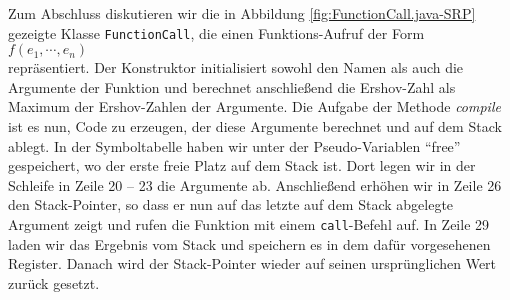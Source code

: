 Zum Abschluss diskutieren wir die in Abbildung \ref{fig:FunctionCall.java-SRP} gezeigte 
 Klasse \texttt{FunctionCall}, die einen Funktions-Aufruf der Form
\\[0.2cm]
\hspace*{1.3cm}
$f(e_1, \cdots, e_n)$
\\[0.2cm]
repr\"asentiert.  Der Konstruktor initialisiert sowohl den Namen als auch die Argumente der
Funktion und berechnet anschlie{\ss}end die Ershov-Zahl als Maximum der Ershov-Zahlen der
Argumente.  Die Aufgabe der Methode \textsl{compile} ist es nun, Code zu erzeugen, der
diese Argumente berechnet und auf dem Stack ablegt.  In der Symboltabelle haben wir unter
der Pseudo-Variablen ``free'' gespeichert, wo der erste freie Platz auf dem
Stack ist. Dort legen wir in der Schleife in Zeile 20 -- 23 die Argumente ab.
Anschlie{\ss}end erh\"ohen wir in Zeile 26 den Stack-Pointer, so dass er nun auf das letzte auf
dem Stack abgelegte Argument zeigt und rufen die Funktion mit einem \texttt{call}-Befehl auf.
In Zeile 29 laden wir das Ergebnis vom Stack und speichern es in dem daf\"ur vorgesehenen
Register.  Danach wird der Stack-Pointer wieder auf seinen urspr\"unglichen Wert zur\"uck gesetzt.

